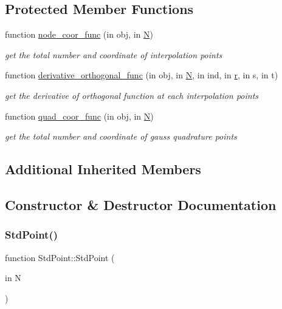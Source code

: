 \subsection*{Protected Member Functions}
\begin{DoxyCompactItemize}
\item 
function \hyperlink{class_std_point_a9ea270965da88851690e018fbb897444}{node\+\_\+coor\+\_\+func} (in obj, in \hyperlink{class_std_cell_a8df35ad5169af36d3dff62644f7878c9}{N})
\begin{DoxyCompactList}\small\item\em get the total number and coordinate of interpolation points \end{DoxyCompactList}\item 
function \hyperlink{class_std_point_a641307c9bbcb03d25cdcd0387be54bd2}{derivative\+\_\+orthogonal\+\_\+func} (in obj, in \hyperlink{class_std_cell_a8df35ad5169af36d3dff62644f7878c9}{N}, in ind, in \hyperlink{class_std_cell_a737dd2feb25f74be0215a594334ec622}{r}, in s, in t)
\begin{DoxyCompactList}\small\item\em get the derivative of orthogonal function at each interpolation points \end{DoxyCompactList}\item 
function \hyperlink{class_std_point_a6e8636439938263e8ba6b653a4aa9067}{quad\+\_\+coor\+\_\+func} (in obj, in \hyperlink{class_std_cell_a8df35ad5169af36d3dff62644f7878c9}{N})
\begin{DoxyCompactList}\small\item\em get the total number and coordinate of gauss quadrature points \end{DoxyCompactList}\end{DoxyCompactItemize}
\subsection*{Additional Inherited Members}


\subsection{Constructor \& Destructor Documentation}
\mbox{\label{class_std_point_a2f3716300385b3cce7cb56b50433fd0e}} 
\subsubsection{\texorpdfstring{Std\+Point()}{StdPoint()}}
{\footnotesize\ttfamily function Std\+Point\+::\+Std\+Point (\begin{DoxyParamCaption}\item[{in}]{N }\end{DoxyParamCaption})}




